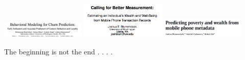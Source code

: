 \documentclass[aspectratio=169]{beamer}
\begin{document}
{
\begin{frame}[plain]

\vspace{3.58in}
\hspace{-0.32in}
\end{frame}
}
\begin{frame}

\begin{center}
\includegraphics[width=0.3\textwidth]{figures/khan_behavioral_2015_title}
\pause
\includegraphics[width=0.3\textwidth]{figures/blumenstock_calling_2014_title}
\pause
\includegraphics[width=0.3\textwidth]{figures/blumenstock_predicting_2015_title}
\end{center}
\pause
\vfill
The beginning is not the end . . . .
\end{frame}
\end{document}
